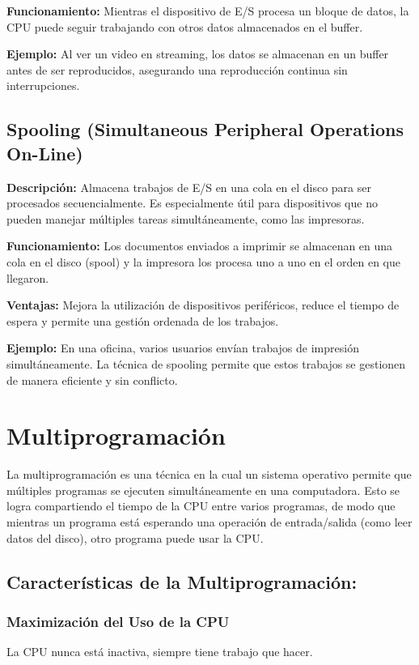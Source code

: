 \textbf{Funcionamiento:} Mientras el dispositivo de E/S procesa un bloque de datos, la CPU puede seguir trabajando con otros datos almacenados en el buffer.

\textbf{Ejemplo: }Al ver un video en streaming, los datos se almacenan en un buffer antes de ser reproducidos, asegurando una reproducción continua sin interrupciones.

\subsection{Spooling (Simultaneous Peripheral Operations On-Line)}

\textbf{Descripción:} Almacena trabajos de E/S en una cola en el disco para ser procesados secuencialmente. Es especialmente útil para dispositivos que no pueden manejar múltiples tareas simultáneamente, como las impresoras.

\textbf{Funcionamiento:} Los documentos enviados a imprimir se almacenan en una cola en el disco (spool) y la impresora los procesa uno a uno en el orden en que llegaron.

\textbf{Ventajas:} Mejora la utilización de dispositivos periféricos, reduce el tiempo de espera y permite una gestión ordenada de los trabajos.

\textbf{Ejemplo:} En una oficina, varios usuarios envían trabajos de impresión simultáneamente. La técnica de spooling permite que estos trabajos se gestionen de manera eficiente y sin conflicto.

\section{Multiprogramación}
La multiprogramación es una técnica en la cual un sistema operativo permite que múltiples programas se ejecuten simultáneamente en una computadora. Esto se logra compartiendo el tiempo de la CPU entre varios programas, de modo que mientras un programa está esperando una operación de entrada/salida (como leer datos del disco), otro programa puede usar la CPU.

\subsection{Características de la Multiprogramación:}
\subsubsection{Maximización del Uso de la CPU}La CPU nunca está inactiva, siempre tiene trabajo que hacer.
